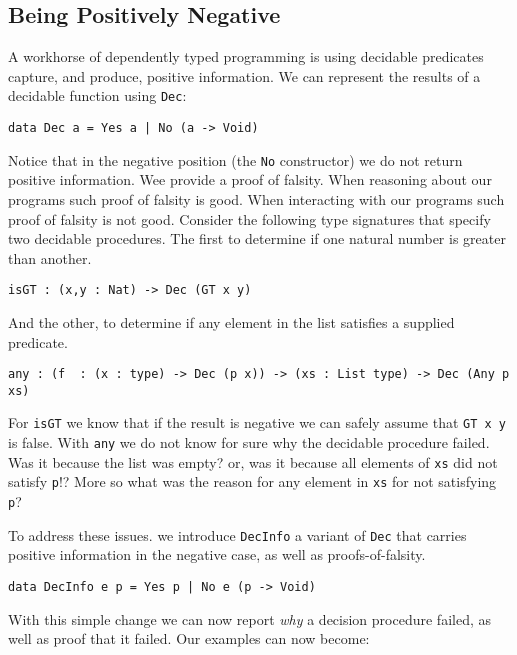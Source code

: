 
\subsection{Being Positively Negative}
\label{sec:idioms:posneg}

A workhorse of dependently typed programming is using decidable predicates capture, and produce, positive information.
We can represent the results of a decidable function using \texttt{Dec}:

\begin{verbatim}
data Dec a = Yes a | No (a -> Void)
\end{verbatim}

\noindent
Notice that in the negative position (the \texttt{No} constructor) we do not return positive information.
Wee provide a proof of falsity.
When reasoning about our programs such proof of falsity is good.
When interacting with our programs such proof of falsity is not good.
Consider the following type signatures that specify two decidable procedures.
The first to determine if one natural number is greater than another.

\begin{verbatim}
isGT : (x,y : Nat) -> Dec (GT x y)
\end{verbatim}

\noindent
And the other, to determine if any element in the list satisfies a supplied predicate.

\begin{verbatim}
any : (f  : (x : type) -> Dec (p x)) -> (xs : List type) -> Dec (Any p xs)
\end{verbatim}

For \texttt{isGT} we know that if the result is negative we can safely assume that \texttt{GT x y} is false.
With \texttt{any} we do not know for sure why the decidable procedure failed.
Was it because the list was empty?
or,
was it because all elements of \texttt{xs} did not satisfy \texttt{p}!?
More so what was the reason for any element in \texttt{xs} for not satisfying \texttt{p}?

To address these issues. we introduce \texttt{DecInfo} a variant of \texttt{Dec} that carries positive information in the negative case, as well as proofs-of-falsity.

\begin{verbatim}
data DecInfo e p = Yes p | No e (p -> Void)
\end{verbatim}

With this simple change we can now report \emph{why} a decision procedure failed, as well as proof that it failed.
Our examples can now become:

